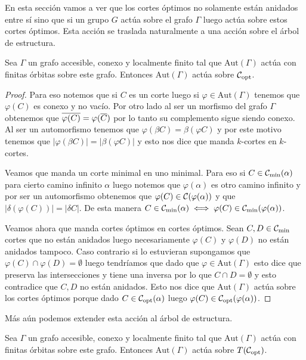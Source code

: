 \documentclass[tesis.tex]{subfiles}
\newcommand{\aut}{\text{Aut}}
\begin{document}
En esta sección vamos a ver que los cortes óptimos no solamente están anidados entre sí sino que si un grupo $G$ actúa sobre el grafo $\Gamma$ luego actúa sobre estos cortes óptimos.
Esta acción se traslada naturalmente a una acción sobre el árbol de estructura.



\begin{prop}
	Sea $\Gamma$ un grafo accesible, conexo y localmente finito tal que $\aut(\Gamma)$ actúa con finitas órbitas sobre este grafo.
	Entonces $\aut(\Gamma)$ actúa sobre ${\cal C}_{\text{opt}}$.
\end{prop}

\begin{proof}
	Para eso notemos que si $C$ es un corte luego si $\varphi \in \aut(\Gamma)$ tenemos que $\varphi(C)$ es conexo y no vacío. 
	Por otro lado al ser un morfismo del grafo $\Gamma$ obtenemos que $\overline{\varphi(C)} = \varphi(\overline C)$ por lo tanto su complemento sigue siendo conexo.
	Al ser un automorfismo tenemos que $\varphi(\beta C) = \beta (\varphi C)$ y por este motivo tenemos que $|\varphi (\beta C)| = |\beta (\varphi C)|$ y esto nos dice que manda $k$-cortes en $k$-cortes.
	
	
	Veamos que manda un corte minimal en uno minimal. 
	Para eso si $C \in {{\cal C}}_{\text{min}}(\alpha)$ para cierto camino infinito $\alpha$ luego notemos que $\varphi(\alpha)$ es otro camino infinito y por ser un automorfismo obtenemos que $\varphi(C) \in {\cal C}({\varphi(\alpha)})$ y que $|\delta(\varphi(C))| = |\delta C|$.
	De esta manera $C \in {\cal C}_{\text{min}}(\alpha) \iff \varphi(C) \in {\cal C}_{\text{min}}(\varphi(\alpha))$.
	
	
	Veamos ahora que manda cortes óptimos en cortes óptimos.
	Sean $C,D \in {\cal C}_{\text{min}}$ cortes que no están anidados luego necesariamente $\varphi(C)$ y $\varphi(D)$ no están anidados tampoco.
	Caso contrario si lo estuvieran supongamos que $\varphi(C) \cap \varphi(D) = \emptyset$ luego tendríamos que dado que $\varphi \in \aut(\Gamma)$ esto dice que preserva las intersecciones y tiene una inversa por lo que $C \cap D = \emptyset$ y esto contradice que $C, D$ no están anidados.
	Esto nos dice que $\aut(\Gamma)$ actúa sobre los cortes óptimos porque dado $C \in {\cal C}_{\text{opt}}(\alpha)$ luego $\varphi(C) \in {\cal C}_{\text{opt}}(\varphi(\alpha))$.
	
\end{proof}

Más aún podemos extender esta acción al árbol de estructura.

\begin{coro}
	Sea $\Gamma$ un grafo accesible, conexo y localmente finito tal que $\aut(\Gamma)$ actúa con finitas órbitas sobre este grafo.
	Entonces $\aut(\Gamma)$ actúa sobre $T({\cal C}_{\text{opt}})$.
\end{coro}
\end{document}
